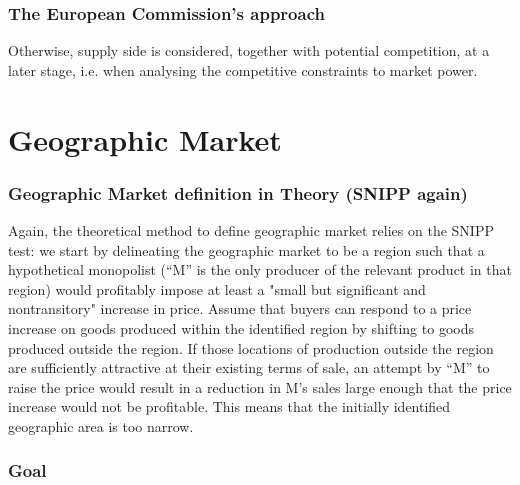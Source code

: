         \subsubsection{The European Commission's approach}


            Otherwise, supply side is considered, together with potential competition, at a later stage, i.e. when analysing the competitive constraints to market power.

            
\newpage
\section{Geographic Market}

        \subsubsection{Geographic Market definition in Theory (SNIPP again)}

            Again, the theoretical method to define geographic market relies on the SNIPP test: we start by delineating the geographic market to be a region such that a hypothetical monopolist (“M” is the only producer of the relevant product in that region) would profitably impose at least a "small but significant and nontransitory" increase in price.
            Assume that buyers can respond to a price increase on goods produced within the identified region by shifting to goods produced outside the region. If those locations of production outside the region are sufficiently attractive at their existing terms of sale, an attempt by “M” to raise the price would result in a reduction in M’s sales large enough that the price increase would not be profitable. This means that the initially identified geographic area is too narrow.

        \subsubsection{Goal}

